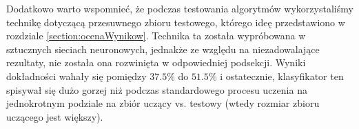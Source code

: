 Dodatkowo warto wspomnieć, że podczas testowania algorytmów wykorzystaliśmy technikę dotyczącą przesuwnego zbioru testowego, którego ideę przedstawiono w rozdziale \ref{section:ocenaWynikow}. Technika ta została wypróbowana w sztucznych sieciach neuronowych, jednakże ze względu na niezadowalające rezultaty, nie została ona rozwinięta w odpowiedniej podsekcji. Wyniki dokładności wahały się pomiędzy $37.5\%$ do $51.5\%$ i ostatecznie, klasyfikator ten spisywał się dużo gorzej niż podczas standardowego procesu uczenia na jednokrotnym podziale na zbiór uczący vs. testowy (wtedy rozmiar zbioru uczącego jest większy).